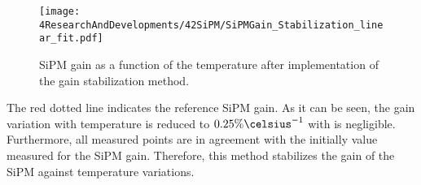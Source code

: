 \begin{figure}[hbtp]
\centering
\texttt{[image: 4ResearchAndDevelopments/42SiPM/SiPMGain\_Stabilization\_linear\_fit.pdf]}
\caption{SiPM gain as a function of the temperature after implementation of the gain stabilization method. \label{fig:SiPMGainStabilization}}
\end{figure}
The red dotted line indicates the reference SiPM gain. As it can be seen, the gain variation with temperature is reduced to $0.25\%\celsius^{-1}$ with is negligible. Furthermore, all measured points are in agreement with the initially value measured for the SiPM gain. Therefore, this method stabilizes the gain of the SiPM against temperature variations.